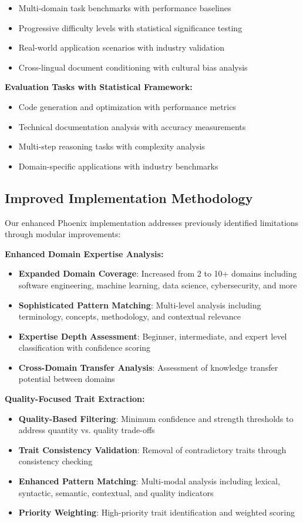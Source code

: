 \documentclass[10pt]{article}
\theoremstyle{definition}
\begin{document}
\begin{itemize}
    \item Multi-domain task benchmarks with performance baselines
    \item Progressive difficulty levels with statistical significance testing
    \item Real-world application scenarios with industry validation
    \item Cross-lingual document conditioning with cultural bias analysis
\end{itemize}

\textbf{Evaluation Tasks with Statistical Framework:}

\begin{itemize}
    \item Code generation and optimization with performance metrics
    \item Technical documentation analysis with accuracy measurements
    \item Multi-step reasoning tasks with complexity analysis
    \item Domain-specific applications with industry benchmarks
\end{itemize}

\subsection{Improved Implementation Methodology}

Our enhanced Phoenix implementation addresses previously identified limitations through modular improvements:

\textbf{Enhanced Domain Expertise Analysis:}
\begin{itemize}
    \item \textbf{Expanded Domain Coverage}: Increased from 2 to 10+ domains including software engineering, machine learning, data science, cybersecurity, and more
    \item \textbf{Sophisticated Pattern Matching}: Multi-level analysis including terminology, concepts, methodology, and contextual relevance
    \item \textbf{Expertise Depth Assessment}: Beginner, intermediate, and expert level classification with confidence scoring
    \item \textbf{Cross-Domain Transfer Analysis}: Assessment of knowledge transfer potential between domains
\end{itemize}

\textbf{Quality-Focused Trait Extraction:}
\begin{itemize}
    \item \textbf{Quality-Based Filtering}: Minimum confidence and strength thresholds to address quantity vs. quality trade-offs
    \item \textbf{Trait Consistency Validation}: Removal of contradictory traits through consistency checking
    \item \textbf{Enhanced Pattern Matching}: Multi-modal analysis including lexical, syntactic, semantic, contextual, and quality indicators
    \item \textbf{Priority Weighting}: High-priority trait identification and weighted scoring
\end{itemize}
\end{document}
